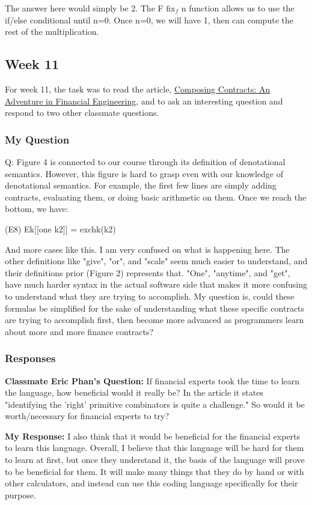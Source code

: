 \documentclass{article}
\theoremstyle{theorem}
\theoremstyle{definition}
\theoremstyle{remark}
\begin{document}
The answer here would simply be 2. The F fix$_f$ n function allows us to use the if/else conditional until n=0. Once n=0, we will have 1, then can compute the rest of the multiplication.


\subsection{Week 11}
For week 11, the task was to read the article, \href{https://www.cs.tufts.edu/~nr/cs257/archive/simon-peyton-jones/contracts.pdf}{Composing Contracts: An Adventure in Financial Engineering}, and to ask an interesting question and respond to two other classmate questions.
\subsubsection{My Question}
Q: Figure 4 is connected to our course through its definition of denotational semantics. However, this figure is hard to grasp even with our knowledge of denotational semantics. For example, the first few lines are simply adding contracts, evaluating them, or doing basic arithmetic on them. Once we reach the bottom, we have:

 (E8) Ek[[one k2]] = exchk(k2)  

And more cases like this. I am very confused on what is happening here. The other definitions like "give", "or", and "scale" seem much easier to understand, and their definitions prior (Figure 2) represents that. "One", "anytime", and "get", have much harder syntax in the actual software side that makes it more confusing to understand what they are trying to accomplish. My question is, could these formulas be simplified for the sake of understanding what these specific contracts are trying to accomplish first, then become more advanced as programmers learn about more and more finance contracts?

\subsubsection{Responses}
\noindent\textbf{Classmate Eric Phan's Question:}
If financial experts took the time to learn the language, how beneficial would it really be? In the article it states "identifying the 'right' primitive combinators is quite a challenge." So would it be worth/necessary for financial experts to try? \newline

\noindent\textbf{My Response: }
I also think that it would be beneficial for the financial experts to learn this language. Overall, I believe that this language will be hard for them to learn at first, but once they understand it, the basis of the language will prove to be beneficial for them. It will make many things that they do by hand or with other calculators, and instead can use this coding language specifically for their purpose. \newline\newline
\end{document}
